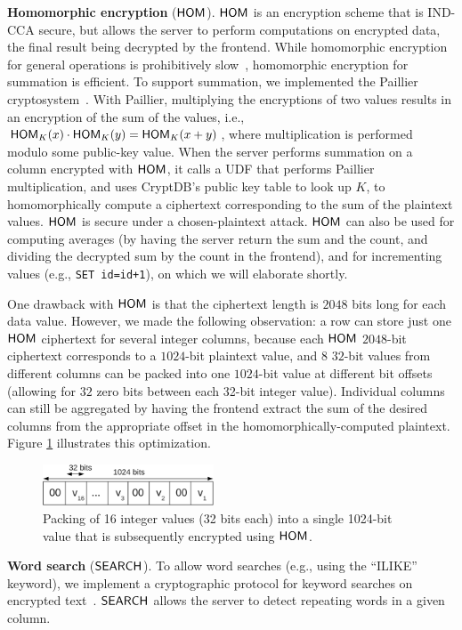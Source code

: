 \textbf{Homomorphic encryption} ($\mathsf{HOM}$)\@. $\mathsf{HOM}$ is an encryption scheme
that is IND-CCA secure, but allows the server to perform computations on
encrypted data, the final result being decrypted by the frontend. While
homomorphic encryption for general operations is prohibitively
slow~\cite{trillion}, homomorphic encryption for summation is efficient.
To support summation, we implemented the Paillier cryptosystem~\cite{Paillier99}.
With Paillier, multiplying the
encryptions of two values results in an encryption of the sum of the values,
i.e., $\mathsf{HOM}_K(x) \cdot \mathsf{HOM}_K(y) = \mathsf{HOM}_K(x+y)$, where multiplication is
performed modulo some public-key value.  When the server performs summation
on a column encrypted with $\mathsf{HOM}$,
it calls a UDF that performs Paillier multiplication, and uses CryptDB's
public key table to look up $K$, to homomorphically compute a ciphertext
corresponding to the sum of the plaintext values.  $\mathsf{HOM}$ is secure under
a chosen-plaintext attack.  $\mathsf{HOM}$ can also be used for computing averages
(by having the server return the sum and the count, and dividing the decrypted
sum by the count in the frontend), and for incrementing values (e.g.,
{\tt SET id=id+1}), on which we will elaborate shortly.

One drawback with $\mathsf{HOM}$ is that the ciphertext length is $2048$ bits long for
each data value. However, we made the following observation: a row can store
just one $\mathsf{HOM}$ ciphertext for several integer columns, because each $\mathsf{HOM}$
$2048$-bit ciphertext corresponds to a $1024$-bit plaintext value, and $8$ $32$-bit
values from different columns can be packed into one $1024$-bit value at
different bit offsets (allowing for $32$ zero bits between each 32-bit integer
value).  Individual columns can still be aggregated by having the frontend
extract the sum of the desired columns from the appropriate offset in the
homomorphically-computed plaintext. Figure \ref{fig:pack} illustrates this
optimization.


\begin{figure}[t!]
\centering
\includegraphics[width=2.0in]{fig/pack.pdf}
\caption{Packing of 16 integer values (32 bits each) into a
	 single 1024-bit value that is subsequently encrypted
	 using $\mathsf{HOM}$.}
\label{fig:pack}
\end{figure}

\textbf{Word search} ($\mathsf{SEARCH}$)\@.  To allow word searches (e.g., using the
``ILIKE'' keyword), we implement a cryptographic protocol for keyword
searches on encrypted text~\cite{Dawn-Song-Search-2000,
amanatidis-boldyreva-o'neill}.  $\mathsf{SEARCH}$ allows the server to detect
repeating words in a given column.


